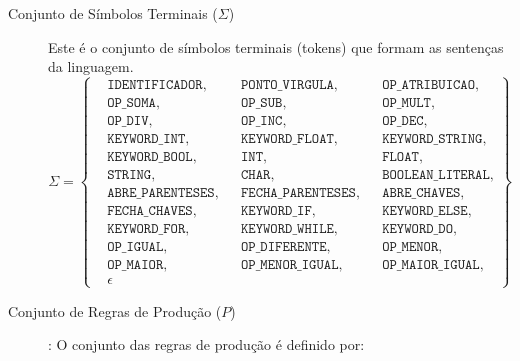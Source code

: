 \documentclass[12pt,a4paper]{article}
\newcommand{\tm}[1]{\ensuremath{\texttt{#1}}}
\begin{document}
\begin{description}
  \item[Conjunto de Símbolos Terminais ($\Sigma$)] 
    Este é o conjunto de símbolos terminais (tokens) que formam as sentenças da linguagem.
    \[
    \Sigma = \left\{
        \begin{alignedat}{3}
        & \tm{IDENTIFICADOR}, && \tm{PONTO\_VIRGULA}, && \tm{OP\_ATRIBUICAO}, \\
        & \tm{OP\_SOMA}, && \tm{OP\_SUB}, && \tm{OP\_MULT}, \\
        & \tm{OP\_DIV}, && \tm{OP\_INC}, && \tm{OP\_DEC}, \\
        & \tm{KEYWORD\_INT}, && \tm{KEYWORD\_FLOAT}, && \tm{KEYWORD\_STRING}, \\
        & \tm{KEYWORD\_BOOL}, && \tm{INT}, && \tm{FLOAT}, \\
        & \tm{STRING}, && \tm{CHAR}, && \tm{BOOLEAN\_LITERAL}, \\
        & \tm{ABRE\_PARENTESES}, && \tm{FECHA\_PARENTESES}, && \tm{ABRE\_CHAVES}, \\
        & \tm{FECHA\_CHAVES}, && \tm{KEYWORD\_IF}, && \tm{KEYWORD\_ELSE}, \\
        & \tm{KEYWORD\_FOR}, && \tm{KEYWORD\_WHILE}, && \tm{KEYWORD\_DO}, \\
        & \tm{OP\_IGUAL}, && \tm{OP\_DIFERENTE}, && \tm{OP\_MENOR}, \\
        & \tm{OP\_MAIOR}, && \tm{OP\_MENOR\_IGUAL}, && \tm{OP\_MAIOR\_IGUAL}, \\
        & \epsilon
        \end{alignedat}
    \right\}
    \]

    \item[Conjunto de Regras de Produção ($P$)]: 
    O conjunto das regras de produção é definido por:


\end{description}
\end{document}
